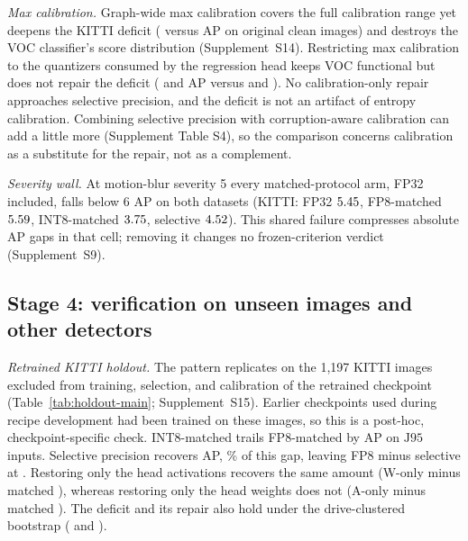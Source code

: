 \documentclass[a4paper,fleqn]{cas-dc}
\newcommand{\Jclean}{\mathrm{J95}}
\begin{document}
\emph{Max calibration.} Graph-wide max calibration covers the full calibration range yet deepens the KITTI deficit (\nnMcMaxJKitti{} versus \nnArmInCleanKitti{} AP on original clean images) and destroys the VOC classifier's score distribution (Supplement~S14). Restricting max calibration to the quantizers consumed by the regression head keeps VOC functional but does not repair the deficit (\nnMcMaxRegJKitti{} and \nnMcMaxRegJVoc{} AP versus \nnArmInCleanKitti{} and \nnArmInCleanVoc{}). No calibration-only repair approaches selective precision, and the deficit is not an artifact of entropy calibration. Combining selective precision with corruption-aware calibration can add a little more (Supplement Table S4), so the comparison concerns calibration as a substitute for the repair, not as a complement.

\emph{Severity wall.} At motion-blur severity 5 every matched-protocol arm, FP32 included, falls below 6 AP on both datasets (KITTI: FP32 $5.45$, FP8-matched $5.59$, INT8-matched $3.75$, selective $4.52$). This shared failure compresses absolute AP gaps in that cell; removing it changes no frozen-criterion verdict (Supplement~S9).

\subsection{Stage 4: verification on unseen images and other detectors}
\label{sec:verification}

\emph{Retrained KITTI holdout.} The pattern replicates on the 1,197 KITTI images excluded from training, selection, and calibration of the retrained checkpoint (Table~\ref{tab:holdout-main}; Supplement~S15). Earlier checkpoints used during recipe development had been trained on these images, so this is a post-hoc, checkpoint-specific check. INT8-matched trails FP8-matched by \nnHvFinFmInJ{} AP on $\Jclean$ inputs. Selective precision recovers \nnHvFinSelInJ{} AP, \nnHvRecovPct\% of this gap, leaving FP8 minus selective at \nnHvFinFeSelJ{}. Restoring only the head activations recovers the same amount (W-only minus matched \nnHvFinWoInJ{}), whereas restoring only the head weights does not (A-only minus matched \nnHvFinAoInJ{}). The deficit and its repair also hold under the drive-clustered bootstrap (\nnHvDrvFmInJ{} and \nnHvDrvSelInJ{}).
\end{document}
